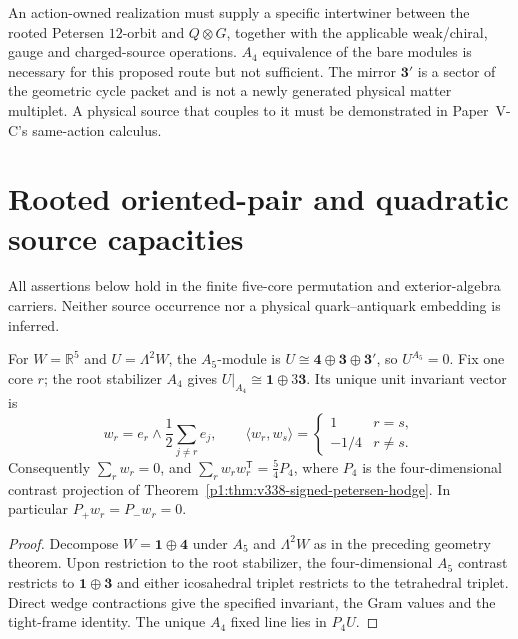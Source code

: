 \documentclass[12pt,a4paper]{article}
\begin{document}
\begin{remark}
\label{p5:rem:v321-crosscore-matter-frontier}
An action-owned realization must supply a specific intertwiner between the
rooted Petersen $12$-orbit and $Q\otimes G$, together with the applicable
weak/chiral, gauge and charged-source operations. $A_4$ equivalence of the
bare modules is necessary for this proposed route but not sufficient.
The mirror $\mathbf3'$ is a sector of the geometric cycle packet and is not
a newly generated physical matter multiplet. A physical source that couples
to it must be demonstrated in Paper~V-C's same-action calculus.
\end{remark}




\section{Rooted oriented-pair and quadratic source capacities}
\label{p5:sec:v338-native-two-source}
All assertions below hold in the finite five-core permutation and
exterior-algebra carriers.  Neither source occurrence nor a physical
quark--antiquark embedding is inferred.

\begin{theorem}
\label{p5:thm:v338-oriented-pair-rooted-scalar}
For $W=\mathbb R^5$ and $U=\Lambda^2W$, the $A_5$-module is
$U\cong\mathbf4\oplus\mathbf3\oplus\mathbf3'$, so
$U^{A_5}=0$.  Fix one core $r$; the root stabilizer $A_4$
gives $U|_{A_4}\cong\mathbf1\oplus3\mathbf3$.
Its unique unit invariant vector is
\[
 w_r=e_r\wedge\frac12\sum_{j\ne r}e_j,
 \qquad \langle w_r,w_s\rangle=\begin{cases}1&r=s,\\-1/4&r\ne s.
 \end{cases}
\]
Consequently $\sum_rw_r=0$, and
$\sum_rw_rw_r^{\mathsf T}=\tfrac54P_4$, where $P_4$ is the
four-dimensional contrast projection of
Theorem~\ref{p1:thm:v338-signed-petersen-hodge}.
In particular $P_+w_r=P_-w_r=0$.
\end{theorem}
\begin{proof}
Decompose $W=\mathbf1\oplus\mathbf4$ under $A_5$ and
$\Lambda^2W$ as in the preceding geometry theorem.  Upon restriction
to the root stabilizer, the four-dimensional $A_5$ contrast restricts
to $\mathbf1\oplus\mathbf3$ and either icosahedral triplet restricts
to the tetrahedral triplet.  Direct wedge contractions give the
specified invariant, the Gram values and the tight-frame identity.
The unique $A_4$ fixed line lies in $P_4U$.
\end{proof}
\end{document}
